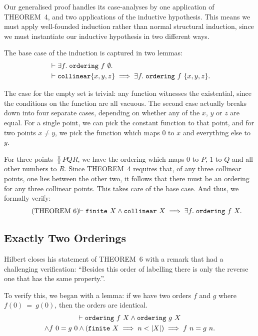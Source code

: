 Our generalised proof handles its case-analyses by one application of THEOREM~4, and two applications of the inductive hypothesis. This means we must apply well-founded induction rather than normal structural induction, since we must instantiate our inductive hypothesis in two different ways. 

The base case of the induction is captured in two lemmas:
\begin{displaymath}
  \begin{aligned}
    &\vdash \exists f.\; \texttt{ordering}\ f\ \emptyset.\\
    &\vdash \texttt{collinear} \{x,y,z\} \implies \exists f.\; \texttt{ordering}\ f\ \{x,y,z\}.
  \end{aligned}
\end{displaymath}

The case for the empty set is trivial: any function witnesses the existential, since the conditions on the function are all vacuous. The second case actually breaks down into four separate cases, depending on whether any of the $x$, $y$ or $z$ are equal. For a single point, we can pick the constant function to that point, and for two points $x \neq y$, we pick the function which maps $0$ to $x$ and everything else to $y$.

For three points $\between{P}{Q}{R}$, we have the ordering which maps $0$ to $P$, $1$ to $Q$ and all other numbers to $R$. Since THEOREM~4 requires that, of any three collinear points, one lies between the other two, it follows that there must be an ordering for any three collinear points. This takes care of the base case. And thus, we formally verify:
\begin{equation}
  \label{eq:six}
  \tag{THEOREM~6}
  \begin{split}
    \vdash\texttt{finite}\ X \wedge \texttt{collinear}\ X \implies \exists f.\; \texttt{ordering}\ f\ X.
  \end{split}
\end{equation}

\subsection{Exactly Two Orderings}
Hilbert closes his statement of THEOREM~6 with a remark that had a challenging verification: ``Besides this order of labelling there is only the reverse one that has the same property.''.

To verify this, we began with a lemma: if we have two orders $f$ and $g$ where\linebreak $f(0)~=~g(0)$, then the orders are identical. 
\begin{multline*}
  \vdash\texttt{ordering}\ f\ X \wedge \texttt{ordering}\ g\ X \\\wedge f\ 0 = g\ 0
  \wedge (\texttt{finite}\ X \implies n < |X|) \implies f\ n = g\ n.
\end{multline*}

